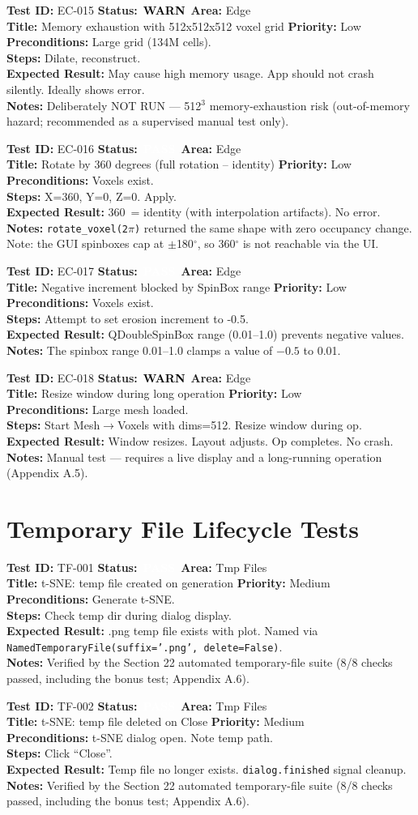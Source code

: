 \documentclass[12pt,a4paper]{article}
\newcommand{\statuspass}{\colorbox{statusgreen}{\textcolor{white}{\textbf{\,PASS\,}}}}
\newcommand{\statuswarn}{\colorbox{statusyellow}{\textcolor{black}{\textbf{\,WARN\,}}}}
\newcommand{\testcase}[9]{%
  \smallskip
  \noindent\textbf{Test ID:} #1 \hfill \textbf{Status:} #2 \hfill \textbf{Area:} #3 \\
  \textbf{Title:} #4 \hfill \textbf{Priority:} #5 \\[0.3em]
  \textbf{Preconditions:} #6 \\[0.3em]
  \textbf{Steps:} #7 \\[0.3em]
  \textbf{Expected Result:} #8 \\
  \textbf{Notes:} #9
  \smallskip
}
\begin{document}
\testcase{EC-015}{\statuswarn}{Edge}{Memory exhaustion with 512x512x512 voxel grid}{Low}{Large grid (134M cells).}{Dilate, reconstruct.}{May cause high memory usage. App should not crash silently. Ideally shows error.}{Deliberately NOT RUN --- 512$^3$ memory-exhaustion risk (out-of-memory hazard; recommended as a supervised manual test only).}


\testcase{EC-016}{\statuspass}{Edge}{Rotate by 360 degrees (full rotation -- identity)}{Low}{Voxels exist.}{X=360\textdegree, Y=0, Z=0. Apply.}{360\textdegree\ = identity (with interpolation artifacts). No error.}{\texttt{rotate\_voxel(2$\pi$)} returned the same shape with zero occupancy change. Note: the GUI spinboxes cap at $\pm$180$^\circ$, so 360$^\circ$ is not reachable via the UI.}


\testcase{EC-017}{\statuspass}{Edge}{Negative increment blocked by SpinBox range}{Low}{Voxels exist.}{Attempt to set erosion increment to -0.5.}{QDoubleSpinBox range (0.01--1.0) prevents negative values.}{The spinbox range 0.01--1.0 clamps a value of $-0.5$ to 0.01.}


\testcase{EC-018}{\statuswarn}{Edge}{Resize window during long operation}{Low}{Large mesh loaded.}{Start Mesh$\rightarrow$Voxels with dims=512. Resize window during op.}{Window resizes. Layout adjusts. Op completes. No crash.}{Manual test --- requires a live display and a long-running operation (Appendix A.5).}



\section{Temporary File Lifecycle Tests}

\testcase{TF-001}{\statuspass}{Tmp Files}{t-SNE: temp file created on generation}{Medium}{Generate t-SNE.}{Check temp dir during dialog display.}{.png temp file exists with plot. Named via \texttt{NamedTemporaryFile(suffix='.png', delete=False)}.}{Verified by the Section 22 automated temporary-file suite (8/8 checks passed, including the bonus test; Appendix A.6).}


\testcase{TF-002}{\statuspass}{Tmp Files}{t-SNE: temp file deleted on Close}{Medium}{t-SNE dialog open. Note temp path.}{Click ``Close''.}{Temp file no longer exists. \texttt{dialog.finished} signal cleanup.}{Verified by the Section 22 automated temporary-file suite (8/8 checks passed, including the bonus test; Appendix A.6).}
\end{document}
